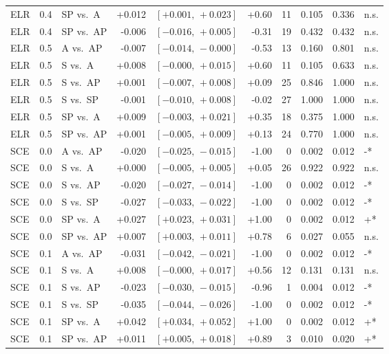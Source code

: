 \begin{landscape}
\begin{scriptsize}
\begin{longtable}{lllrrrrrrl}
ELR & 0.4 & SP vs.\ A & +0.012 & $[+0.001,\,+0.023]$ & +0.60 & 11 & 0.105 & 0.336 & n.s. \\
ELR & 0.4 & SP vs.\ AP & -0.006 & $[-0.016,\,+0.005]$ & -0.31 & 19 & 0.432 & 0.432 & n.s. \\
ELR & 0.5 & A vs.\ AP & -0.007 & $[-0.014,\,-0.000]$ & -0.53 & 13 & 0.160 & 0.801 & n.s. \\
ELR & 0.5 & S vs.\ A & +0.008 & $[-0.000,\,+0.015]$ & +0.60 & 11 & 0.105 & 0.633 & n.s. \\
ELR & 0.5 & S vs.\ AP & +0.001 & $[-0.007,\,+0.008]$ & +0.09 & 25 & 0.846 & 1.000 & n.s. \\
ELR & 0.5 & S vs.\ SP & -0.001 & $[-0.010,\,+0.008]$ & -0.02 & 27 & 1.000 & 1.000 & n.s. \\
ELR & 0.5 & SP vs.\ A & +0.009 & $[-0.003,\,+0.021]$ & +0.35 & 18 & 0.375 & 1.000 & n.s. \\
ELR & 0.5 & SP vs.\ AP & +0.001 & $[-0.005,\,+0.009]$ & +0.13 & 24 & 0.770 & 1.000 & n.s. \\
SCE & 0.0 & A vs.\ AP & -0.020 & $[-0.025,\,-0.015]$ & -1.00 & 0 & 0.002 & 0.012 & -* \\
SCE & 0.0 & S vs.\ A & +0.000 & $[-0.005,\,+0.005]$ & +0.05 & 26 & 0.922 & 0.922 & n.s. \\
SCE & 0.0 & S vs.\ AP & -0.020 & $[-0.027,\,-0.014]$ & -1.00 & 0 & 0.002 & 0.012 & -* \\
SCE & 0.0 & S vs.\ SP & -0.027 & $[-0.033,\,-0.022]$ & -1.00 & 0 & 0.002 & 0.012 & -* \\
SCE & 0.0 & SP vs.\ A & +0.027 & $[+0.023,\,+0.031]$ & +1.00 & 0 & 0.002 & 0.012 & +* \\
SCE & 0.0 & SP vs.\ AP & +0.007 & $[+0.003,\,+0.011]$ & +0.78 & 6 & 0.027 & 0.055 & n.s. \\
SCE & 0.1 & A vs.\ AP & -0.031 & $[-0.042,\,-0.021]$ & -1.00 & 0 & 0.002 & 0.012 & -* \\
SCE & 0.1 & S vs.\ A & +0.008 & $[-0.000,\,+0.017]$ & +0.56 & 12 & 0.131 & 0.131 & n.s. \\
SCE & 0.1 & S vs.\ AP & -0.023 & $[-0.030,\,-0.015]$ & -0.96 & 1 & 0.004 & 0.012 & -* \\
SCE & 0.1 & S vs.\ SP & -0.035 & $[-0.044,\,-0.026]$ & -1.00 & 0 & 0.002 & 0.012 & -* \\
SCE & 0.1 & SP vs.\ A & +0.042 & $[+0.034,\,+0.052]$ & +1.00 & 0 & 0.002 & 0.012 & +* \\
SCE & 0.1 & SP vs.\ AP & +0.011 & $[+0.005,\,+0.018]$ & +0.89 & 3 & 0.010 & 0.020 & +* \\

\end{longtable}
\end{scriptsize}
\end{landscape}

